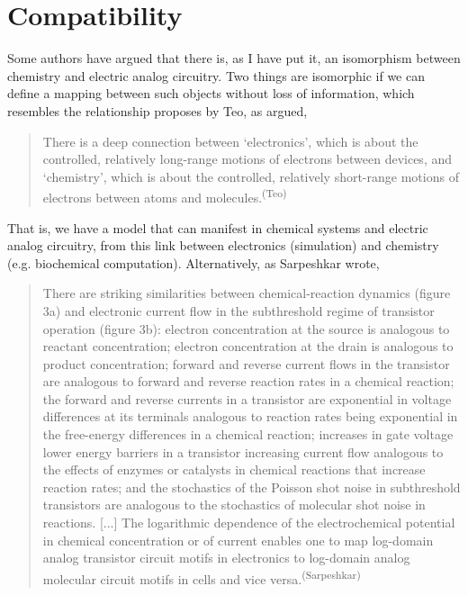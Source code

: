 
\section*{Compatibility}

Some authors have argued that there is, as I have put it, an isomorphism between chemistry and electric analog circuitry. Two things are isomorphic if we can define a mapping between such objects without loss of information, which resembles the relationship proposes by Teo, as argued,
\begin{quotation}
    There is a deep connection between ‘electronics’, which is about the controlled, relatively long-range motions of electrons between devices, and ‘chemistry’, which is about the controlled, relatively short-range motions of electrons between atoms and molecules.\textsuperscript{(Teo)}
\end{quotation}

That is, we have a model that can manifest in chemical systems and electric analog circuitry, from this link between electronics (simulation) and chemistry (e.g. biochemical computation). Alternatively, as Sarpeshkar wrote,
\begin{quotation}
    There are striking similarities between chemical-reaction dynamics (figure 3a) and electronic current flow in the subthreshold regime of transistor operation (figure 3b): electron concentration at the source is analogous to reactant concentration; electron concentration at the drain is analogous to product concentration; forward and reverse current flows in the transistor are analogous to forward and reverse reaction rates in a chemical reaction; the forward and reverse currents in a transistor are exponential in voltage differences at its terminals analogous to reaction rates being exponential in the free-energy differences in a chemical reaction; increases in gate voltage lower energy barriers in a transistor increasing current flow analogous to the effects of enzymes or catalysts in chemical reactions that increase reaction rates; and the stochastics of the Poisson shot noise in subthreshold transistors are analogous to the stochastics of molecular shot noise in reactions. [...] The logarithmic dependence of the electrochemical potential in chemical concentration or of current enables one to map log-domain analog transistor circuit motifs in electronics to log-domain analog molecular circuit motifs in cells and vice versa.\textsuperscript{(Sarpeshkar)}
\end{quotation}

